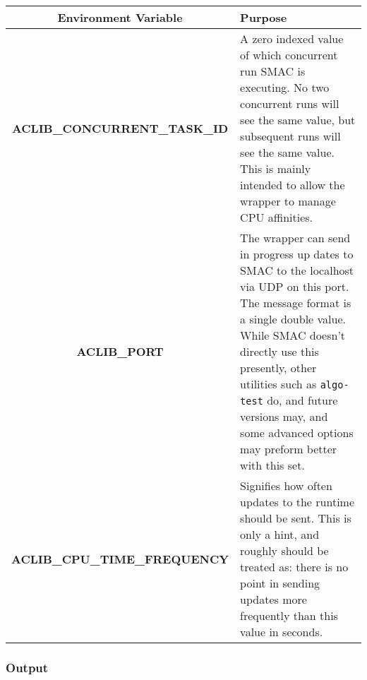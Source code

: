 \documentclass[manual.tex]{subfiles}
\begin{document}
\begin{center}
\begin{tabular}{| c | p{10cm} |}
\hline
\textbf{Environment Variable} & \textbf{Purpose} \\
\hline
\textbf{ ACLIB\_CONCURRENT\_TASK\_ID } &  A zero indexed value of which concurrent run SMAC is executing. No two concurrent runs will see the same value, but subsequent runs will see the same value. This is mainly intended to allow the wrapper to manage CPU affinities. \\
\hline 
\textbf{ ACLIB\_PORT} & The wrapper can send in progress up dates to SMAC to the localhost via UDP on this port. The message format is a single double value. While SMAC doesn't directly use this presently, other utilities such as \texttt{algo-test} do, and future versions may, and some advanced options may preform better with this set. \\
\hline 
\textbf{ ACLIB\_CPU\_TIME\_FREQUENCY } & Signifies how often updates to the runtime should be sent. This is only a hint, and roughly should be treated as: there is no point in sending updates more frequently than this value in seconds. \\
\hline
\end{tabular}
\end{center}



\subsubsection{Output}\label{sec:wrapper_output}
\end{document}
